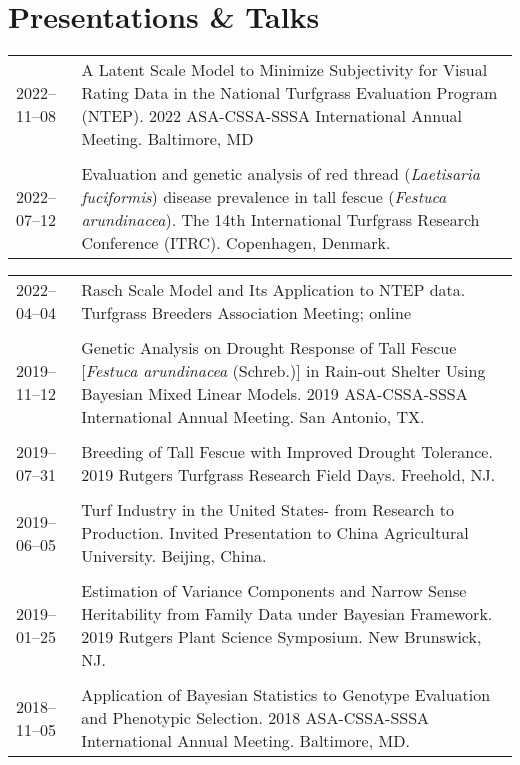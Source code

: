 \documentclass[letterpaper,11pt, english]{article}
\begin{document}
\section{Presentations \& Talks}
\begin{flushleft}
  \begin{tabularx}{\textwidth}{@{}lX@{}}
    2022--11--08 \hspace{1cm} & A Latent Scale Model to Minimize Subjectivity for Visual Rating Data in the National Turfgrass Evaluation Program (NTEP). 2022 ASA-CSSA-SSSA International Annual Meeting. Baltimore, MD \\
    \\[-0.2cm] 
    2022--07--12 \hspace{1cm} & Evaluation and genetic analysis of red thread (\textit{Laetisaria fuciformis}) disease prevalence in tall fescue (\textit{Festuca arundinacea}). The 14th International Turfgrass Research Conference (ITRC). Copenhagen, Denmark. \\
  \end{tabularx}
\end{flushleft}
\begin{flushleft}
    \begin{tabularx}{\textwidth}{@{}lX@{}}
    2022--04--04 \hspace{1cm} & Rasch Scale Model and Its Application to NTEP data. Turfgrass Breeders Association Meeting; online \\
    \\[-0.2cm]
    2019--11--12 \hspace{1cm} & Genetic Analysis on Drought Response of Tall Fescue [\textit{Festuca arundinacea} (Schreb.)] in Rain-out Shelter Using Bayesian Mixed Linear Models. 2019 ASA-CSSA-SSSA International Annual Meeting. San Antonio, TX. \\
      \\[-0.2cm]
    2019--07--31 \hspace{1cm} & Breeding of Tall Fescue with Improved Drought Tolerance. 2019 Rutgers Turfgrass Research Field Days. Freehold, NJ. \\
    \\[-0.2cm]
    2019--06--05 \hspace{1cm} & Turf Industry in the United States- from Research to Production. Invited Presentation to China Agricultural University. Beijing, China. \\
    \\[-0.2cm]
    2019--01--25 \hspace{1cm} & Estimation of Variance Components and Narrow Sense Heritability from Family Data under Bayesian Framework. 2019 Rutgers Plant Science Symposium. New Brunswick, NJ. \\
    \\[-0.2cm]
    2018--11--05 \hspace{1cm} & Application of Bayesian Statistics to Genotype Evaluation and Phenotypic Selection. 2018 ASA-CSSA-SSSA International Annual Meeting. Baltimore, MD. \\
  \end{tabularx}
\end{flushleft}
\end{document}
